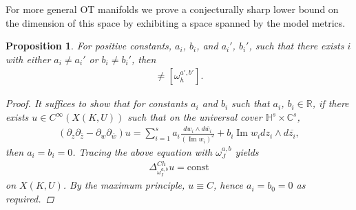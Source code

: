 \documentclass[12pt]{amsart}
\numberwithin{equation}{section}
\newtheorem{prop}{Proposition}
\numberwithin{prop}{section}
\theoremstyle{definition}
\renewcommand{\bar}[1]{\overline{#1}}
\begin{document}
For more general OT manifolds we prove a conjecturally sharp lower bound on the dimension of this space by exhibiting a space spanned by the model metrics.
\begin{prop}
    For positive constants, $a_i$, $b_i$, and $a_i'$, $b_i'$, such that there exists $i$ with either $a_i \neq a_i'$ or $b_i\neq b_i'$, then
    \begin{align*}
        [\omega^{a,b}_h]\neq [\omega^{a',b'}_h].
    \end{align*}
    \begin{proof}
    It suffices to show that for constants $a_i$ and $b_i$ such that $a_i$, $b_i\in \mathbb{R}$, if there exists $u\in C^\infty(X(K,U))$ such that on the universal cover $\mathbb{H}^s\times\mathbb{C}^s$,
    \begin{align*}
        ({\partial_z\partial_{\bar{z}}}-{\partial_w\partial_{\bar{w}}}) u = \sum_{i=1}^sa_i\frac{dw_i\wedge d\bar{w_i}}{(\operatorname{Im}w_i)^2} + b_i\operatorname{Im}w_i dz_i\wedge d\bar{z_i},
    \end{align*}
    then $a_i = b_i = 0$.  Tracing the above equation with $\omega^{a,b}_J$ yields
    \begin{align*}
        \Delta^{Ch}_{\omega_I^{a,b}} u = \mbox{const}
    \end{align*}
    on $X(K,U)$. By the maximum principle, $u\equiv C$, hence $a_i = b_0 = 0$ as required.
    \end{proof}
\end{prop}


\end{document}
